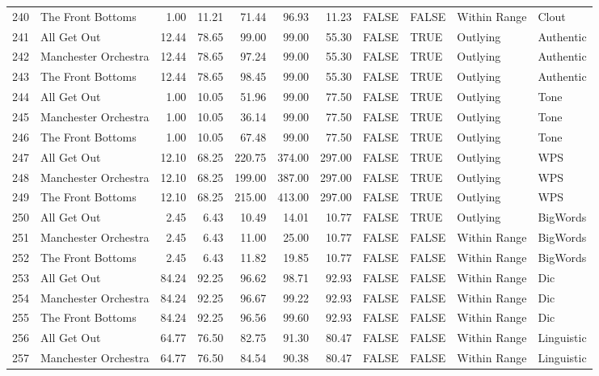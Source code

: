 \begin{table}[ht]
\begin{tabular}{rlrrrrrllll}
  240 & The Front Bottoms & 1.00 & 11.21 & 71.44 & 96.93 & 11.23 & FALSE & FALSE & Within Range & Clout \\ 
  241 & All Get Out & 12.44 & 78.65 & 99.00 & 99.00 & 55.30 & FALSE & TRUE & Outlying & Authentic \\ 
  242 & Manchester Orchestra & 12.44 & 78.65 & 97.24 & 99.00 & 55.30 & FALSE & TRUE & Outlying & Authentic \\ 
  243 & The Front Bottoms & 12.44 & 78.65 & 98.45 & 99.00 & 55.30 & FALSE & TRUE & Outlying & Authentic \\ 
  244 & All Get Out & 1.00 & 10.05 & 51.96 & 99.00 & 77.50 & FALSE & TRUE & Outlying & Tone \\ 
  245 & Manchester Orchestra & 1.00 & 10.05 & 36.14 & 99.00 & 77.50 & FALSE & TRUE & Outlying & Tone \\ 
  246 & The Front Bottoms & 1.00 & 10.05 & 67.48 & 99.00 & 77.50 & FALSE & TRUE & Outlying & Tone \\ 
  247 & All Get Out & 12.10 & 68.25 & 220.75 & 374.00 & 297.00 & FALSE & TRUE & Outlying & WPS \\ 
  248 & Manchester Orchestra & 12.10 & 68.25 & 199.00 & 387.00 & 297.00 & FALSE & TRUE & Outlying & WPS \\ 
  249 & The Front Bottoms & 12.10 & 68.25 & 215.00 & 413.00 & 297.00 & FALSE & TRUE & Outlying & WPS \\ 
  250 & All Get Out & 2.45 & 6.43 & 10.49 & 14.01 & 10.77 & FALSE & TRUE & Outlying & BigWords \\ 
  251 & Manchester Orchestra & 2.45 & 6.43 & 11.00 & 25.00 & 10.77 & FALSE & FALSE & Within Range & BigWords \\ 
  252 & The Front Bottoms & 2.45 & 6.43 & 11.82 & 19.85 & 10.77 & FALSE & FALSE & Within Range & BigWords \\ 
  253 & All Get Out & 84.24 & 92.25 & 96.62 & 98.71 & 92.93 & FALSE & FALSE & Within Range & Dic \\ 
  254 & Manchester Orchestra & 84.24 & 92.25 & 96.67 & 99.22 & 92.93 & FALSE & FALSE & Within Range & Dic \\ 
  255 & The Front Bottoms & 84.24 & 92.25 & 96.56 & 99.60 & 92.93 & FALSE & FALSE & Within Range & Dic \\ 
  256 & All Get Out & 64.77 & 76.50 & 82.75 & 91.30 & 80.47 & FALSE & FALSE & Within Range & Linguistic \\ 
  257 & Manchester Orchestra & 64.77 & 76.50 & 84.54 & 90.38 & 80.47 & FALSE & FALSE & Within Range & Linguistic \\ 

\end{tabular}
\end{table}
